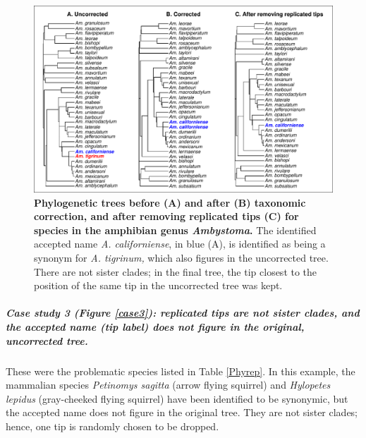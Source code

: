 \documentclass[11pt]{article}
\begin{document}
\begin{figure}[h!]
\centering
\includegraphics[scale=0.7]{figures/Case_studies/Case2}
\caption[Phylogenetic trees before (A) and after (B) taxonomic correction, and after removing replicated tips (C) for species in the amphibian genus \textit{Ambystoma}]{\textbf{Phylogenetic trees before (A) and after (B) taxonomic correction, and after removing replicated tips (C) for species in the amphibian genus \textit{Ambystoma}.} The identified accepted name \textit{A. californiense}, in blue (A), is identified as being a synonym for \textit{A. tigrinum,} which also figures in the uncorrected tree. There are not sister clades; in the final tree, the tip closest to the position of the same tip in the uncorrected tree was kept.}
\label{case2}
\end{figure}

\subparagraph{Case study 3 (Figure \ref{case3}): replicated tips are not sister clades, and the accepted name (tip label) does not figure in the original, uncorrected tree.} These were the problematic species listed in Table \ref{Phyrep}. In this example, the mammalian species \textit{Petinomys sagitta} (arrow flying squirrel) and  \textit{Hylopetes lepidus} (gray-cheeked flying squirrel)  have been identified to be synonymic, but the accepted name does not figure in the original tree. They are not sister clades; hence, one tip is randomly chosen to be dropped.
\end{document}
